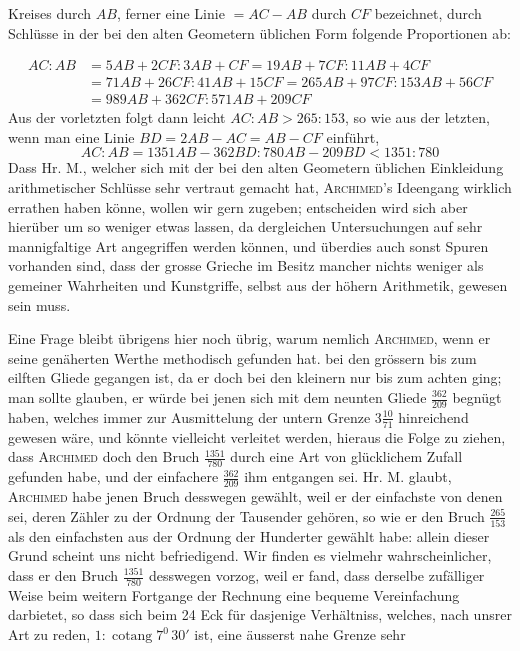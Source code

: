 %
Kreises durch \(AB\), ferner eine Linie \(=AC-AB\) durch \(CF\) bezeichnet, durch Schlüsse in der bei den alten Geometern üblichen Form folgende Proportionen ab:
\par
{\fontsize{10}{12}\selectfont
\[
\begin{aligned}
AC:AB&=5AB+2CF:3AB+CF=19AB+7CF:11AB+4CF\\
&=71AB+26CF:41AB+15CF=265AB+97CF:153AB+56CF\\
&=989AB+362CF:571AB+209CF
\end{aligned}
\]
}
Aus der vorletzten folgt dann leicht \(AC:AB>265:153\), so wie aus der letzten, wenn man eine Linie \(BD=2AB-AC=AB-CF\) einführt,
\[
AC:AB=1351AB-362BD:780AB-209BD<1351:780
\]
Dass Hr. M., welcher sich mit der bei den alten Geometern üblichen Einkleidung arithmetischer Schlüsse sehr vertraut gemacht hat, \textsc{Archimed}'s Ideengang wirklich errathen haben könne, wollen wir gern zugeben; entscheiden wird sich aber hierüber um so weniger etwas lassen, da dergleichen Untersuchungen auf sehr mannigfaltige Art angegriffen werden können, und überdies auch sonst Spuren vorhanden sind, dass der grosse Grieche im Besitz mancher nichts weniger als gemeiner Wahrheiten und Kunstgriffe, selbst aus der höhern Arithmetik, gewesen sein muss.

Eine Frage bleibt übrigens hier noch übrig, warum nemlich \textsc{Archimed}, wenn er seine genäherten Werthe methodisch gefunden hat. bei den grössern bis zum eilften Gliede gegangen ist, da er doch bei den kleinern nur bis zum achten ging; man sollte glauben, er würde bei jenen sich mit dem neunten Gliede \(\frac{362}{209}\) begnügt haben, welches immer zur Ausmittelung der untern Grenze \(3\frac{10}{71}\) hinreichend gewesen wäre, und könnte vielleicht verleitet werden, hieraus die Folge zu ziehen, dass \textsc{Archimed} doch den Bruch \(\frac{1351}{780}\) durch eine Art von glücklichem Zufall gefunden habe, und der einfachere \(\frac{362}{209}\) ihm entgangen sei. Hr. M. glaubt, \textsc{Archimed} habe jenen Bruch desswegen gewählt, weil er der einfachste von denen sei, deren Zähler zu der Ordnung der Tausender gehören, so wie er den Bruch \(\frac{265}{153}\) als den einfachsten aus der Ordnung der Hunderter gewählt habe: allein dieser Grund scheint uns nicht befriedigend. Wir finden es vielmehr wahrscheinlicher, dass er den Bruch \(\frac{1351}{780}\) desswegen vorzog, weil er fand, dass derselbe zufälliger Weise beim weitern Fortgange der Rechnung eine bequeme Vereinfachung darbietet, so dass sich beim 24 Eck für dasjenige Verhältniss, welches, nach unsrer Art zu reden, \(1:\operatorname{cotang}7^0\,30'\) ist, eine äusserst nahe Grenze sehr
